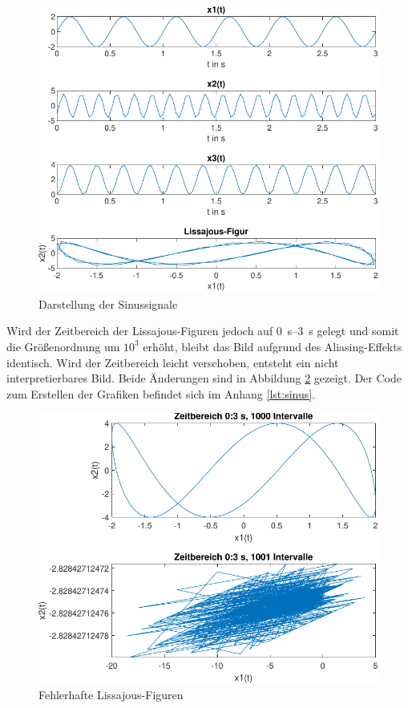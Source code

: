 \documentclass[
    paper=a4,
    fontsize=10pt,
    DIV=13,
    oneside,
]{scrartcl}
\begin{document}
    \begin{figure}[hbt]
        \centering
        \includegraphics[width=\imagewidth]{../versuch1/sinus}
        \caption{Darstellung der Sinussignale}
        \label{fig:sinus}
    \end{figure}

    Wird der Zeitbereich der Lissajous-Figuren jedoch auf \SIrange{0}{3}{\second} gelegt und somit die Größenordnung um \(10^3\) erhöht, bleibt das Bild aufgrund des Aliasing-Effekts identisch. Wird der Zeitbereich leicht verschoben, entsteht ein nicht interpretierbares Bild. Beide Änderungen sind in Abbildung \ref{fig:lissajous} gezeigt. Der Code zum Erstellen der Grafiken befindet sich im Anhang \ref{lst:sinus}.

    \begin{figure}[hbt]
        \centering
        \includegraphics[width=\imagewidth]{../versuch1/lissjaou}
        \caption{Fehlerhafte Lissajous-Figuren}
        \label{fig:lissajous}
    \end{figure}
\end{document}
